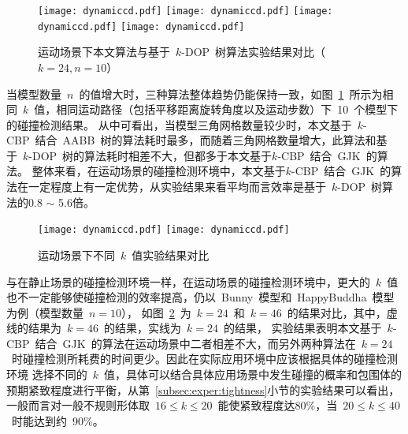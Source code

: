 \begin{figure}[!ht] 
\centering
{}
{  
   \texttt{[image: dynamiccd.pdf]}
}
{  
   \texttt{[image: dynamiccd.pdf]}
}\linebreak %
{  
   \texttt{[image: dynamiccd.pdf]}
}
{  
   \texttt{[image: dynamiccd.pdf]}
}
\caption{运动场景下本文算法与基于~$k$-DOP~树算法实验结果对比（$k=24,n=10$）}
\label{fig:chart:exps:kdop:kcbp:k24:m10:dynamic}
\end{figure}

当模型数量~$n$~的值增大时，三种算法整体趋势仍能保持一致，如图~\ref{fig:chart:exps:kdop:kcbp:k24:m10:dynamic}~所示为相同~$k$~值，相同运动路径（包括平移距离旋转角度以及运动步数）下~10~个模型下的碰撞检测结果。
从中可看出，当模型三角网格数量较少时，本文基于~$k$-CBP~结合~AABB~树的算法耗时最多，而随着三角网格数量增大，此算法和基于~$k$-DOP~树的算法耗时相差不大，但都多于本文基于$k$-CBP~结合~GJK~的算法。
整体来看，在运动场景的碰撞检测环境中，本文基于$k$-CBP~结合~GJK~的算法在一定程度上有一定优势，从实验结果来看平均而言效率是基于~$k$-DOP~树算法的0.8 $\sim$ 5.6倍。%
\begin{figure}[!ht] 
\centering
{}
{  
   \texttt{[image: dynamiccd.pdf]}
}
{  
    \texttt{[image: dynamiccd.pdf]}
}
\caption{运动场景下不同~$k$~值实验结果对比}
\label{fig:chart:exp:kdop:kcbp:k24:k46:dynamic}
\end{figure}

与在静止场景的碰撞检测环境一样，在运动场景的碰撞检测环境中，更大的~$k$~值也不一定能够使碰撞检测的效率提高，仍以~Bunny~模型和~HappyBuddha~模型为例（模型数量~$n=10$），
如图~\ref{fig:chart:exp:kdop:kcbp:k24:k46:dynamic}~为~$k=24$~和~$k=46$~的结果对比，其中，虚线的结果为~$k=46$~的结果，实线为~$k=24$~的结果，
实验结果表明本文基于~$k$-CBP~结合~GJK~的算法在运动场景中二者相差不大，而另外两种算法在~$k=24$~时碰撞检测所耗费的时间更少。因此在实际应用环境中应该根据具体的碰撞检测环境
选择不同的~$k$~值，具体可以结合具体应用场景中发生碰撞的概率和包围体的预期紧致程度进行平衡，从第~\ref{subsec:exper:tightness}小节的实验结果可以看出，
一般而言对一般不规则形体取~$16 \leq k \leq 20$~能使紧致程度达80\%，当~$20 \leq k \leq 40 $~时能达到约~90\%。 

